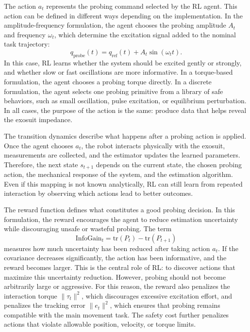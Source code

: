 \documentclass[11pt]{article}
\begin{document}
The action \(a_t\) represents the probing command selected by the RL agent. This action can be defined in different ways depending on the implementation. In the amplitude-frequency formulation, the agent chooses the probing amplitude \(A_t\) and frequency \(\omega_t\), which determine the excitation signal added to the nominal task trajectory:
\begin{equation}
q_{\mathrm{probe}}(t)=q_{\mathrm{ref}}(t)+A_t\sin(\omega_t t).
\end{equation}
In this case, RL learns whether the system should be excited gently or strongly, and whether slow or fast oscillations are more informative. In a torque-based formulation, the agent chooses a probing torque directly. In a discrete formulation, the agent selects one probing primitive from a library of safe behaviors, such as small oscillation, pulse excitation, or equilibrium perturbation. In all cases, the purpose of the action is the same: produce data that helps reveal the exosuit impedance.

The transition dynamics describe what happens after a probing action is applied. Once the agent chooses \(a_t\), the robot interacts physically with the exosuit, measurements are collected, and the estimator updates the learned parameters. Therefore, the next state \(s_{t+1}\) depends on the current state, the chosen probing action, the mechanical response of the system, and the estimation algorithm. Even if this mapping is not known analytically, RL can still learn from repeated interaction by observing which actions lead to better outcomes.

The reward function defines what constitutes a good probing decision. In this formulation, the reward encourages the agent to reduce estimation uncertainty while discouraging unsafe or wasteful probing. The term
\begin{equation}
\mathrm{InfoGain}_t=\mathrm{tr}(P_t)-\mathrm{tr}(P_{t+1})
\end{equation}
measures how much uncertainty has been reduced after taking action \(a_t\). If the covariance decreases significantly, the action has been informative, and the reward becomes larger. This is the central role of RL: to discover actions that maximize this uncertainty reduction. However, probing should not become arbitrarily large or aggressive. For this reason, the reward also penalizes the interaction torque \(\|\tau_t\|^2\), which discourages excessive excitation effort, and penalizes the tracking error \(\|e_t\|^2\), which ensures that probing remains compatible with the main movement task. The safety cost further penalizes actions that violate allowable position, velocity, or torque limits.
\end{document}
